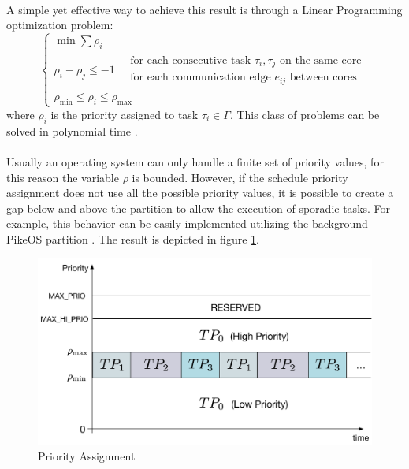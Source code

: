 \paragraph{} A simple yet effective way to achieve this result is through a Linear Programming optimization problem:
\begin{equation}
\begin{cases}
\min \sum\rho_i \\ 
\rho_i - \rho_j \leq -1 \quad
\begin{matrix}
\text{for each consecutive task } \tau_i,\tau_j \text{ on the same core} \\
\text{for each communication edge } e_{ij} \text{ between cores}
\end{matrix} \\
\rho_{\min} \leq \rho_i \leq \rho_{\max}
\end{cases}
\end{equation}
where $\rho_i$ is the priority assigned to task $\tau_i\in\Gamma$. This class of problems can be solved in polynomial time \cite{polyLP}.

\paragraph{} Usually an operating system can only handle a finite set of priority values, for this reason the variable $\rho$ is bounded. However, if the schedule priority assignment does not use all the possible priority values, it is possible to create a gap below and above the partition to allow the execution of sporadic tasks. For example, this behavior can be easily implemented utilizing the background PikeOS partition . The result is depicted in figure \ref{fig:PriorityAssignment}.

\begin{figure}[htbp] 
\centering    
\includegraphics[width=1.0\textwidth]{PriorityAssignment}
\caption{Priority Assignment }
\label{fig:PriorityAssignment}
\end{figure}
